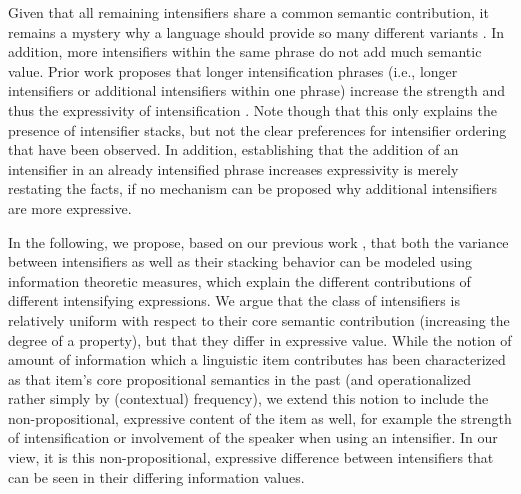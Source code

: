 \documentclass[output=paper,colorlinks,citecolor=brown]{langscibook}
\begin{document}
Given that all remaining intensifiers share a common semantic contribution, it remains a mystery why a language should provide so many different variants \citep[for German, see e.g.][]{claudi_intensifiers_2006,stratton_adjective_2020}. In addition, more intensifiers within the same phrase do not add much semantic value. Prior work proposes that longer intensification phrases (i.e., longer intensifiers or additional intensifiers within one phrase) increase the strength and thus the expressivity of  intensification \citep{fortin2011,bennett2018extremely,Fortin2022Jul}. Note though that this only explains the presence of intensifier stacks, but not the clear preferences for intensifier ordering that have been observed. In addition, establishing that the addition of an intensifier in an already intensified phrase increases expressivity is merely restating the facts, if no mechanism can be proposed why additional intensifiers are more expressive. 

In the following, we propose, based on our previous work \citep{richter2020ranking,scherihou2022}, that both the variance between intensifiers as well as their stacking behavior can be modeled using information theoretic measures, which explain the different contributions of different intensifying expressions.
We argue that the class of intensifiers is relatively uniform with respect to their core semantic contribution (increasing the degree of a property), but that they differ in expressive value. While the notion of amount of information which a linguistic item contributes has been characterized as that item's core propositional semantics in the past (and operationalized rather simply by (contextual) frequency), we extend this notion to include the non-propositional, expressive content of the item as well, for example the strength of intensification or involvement of the speaker when using an intensifier. In our view, it is this non-propositional, expressive difference between intensifiers that can be seen in their differing information values.
\end{document}
